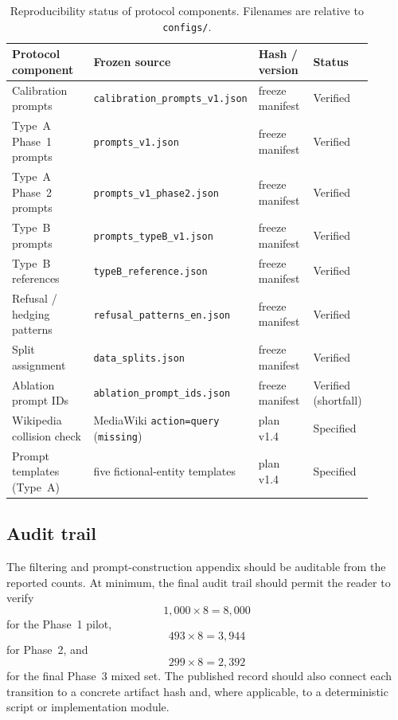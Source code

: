 \documentclass{article}
\begin{document}
\begin{table}[t]
\centering
\caption{Reproducibility status of protocol components. Filenames are relative to \texttt{configs/}.}
\label{tab:repro-status}
\small
\setlength{\tabcolsep}{3pt}
\begin{tabular}{@{}p{0.26\linewidth}p{0.34\linewidth}p{0.16\linewidth}p{0.14\linewidth}@{}}
\toprule
Protocol component & Frozen source & Hash / version & Status \\
\midrule
Calibration prompts & \texttt{calibration\_prompts\_v1.json} & freeze manifest & Verified \\
Type~A Phase~1 prompts & \texttt{prompts\_v1.json} & freeze manifest & Verified \\
Type~A Phase~2 prompts & \texttt{prompts\_v1\_phase2.json} & freeze manifest & Verified \\
Type~B prompts & \texttt{prompts\_typeB\_v1.json} & freeze manifest & Verified \\
Type~B references & \texttt{typeB\_reference.json} & freeze manifest & Verified \\
Refusal / hedging patterns & \texttt{refusal\_patterns\_en.json} & freeze manifest & Verified \\
Split assignment & \texttt{data\_splits.json} & freeze manifest & Verified \\
Ablation prompt {IDs} & \texttt{ablation\_prompt\_ids.json} & freeze manifest & Verified (shortfall) \\
Wikipedia collision check & MediaWiki \texttt{action=query} (\texttt{missing}) & plan v1.4 & Specified \\
Prompt templates (Type~A) & five fictional-entity templates & plan v1.4 & Specified \\
\bottomrule
\end{tabular}
\end{table}

\subsection{Audit trail}
\label{app:b-audit}

The filtering and prompt-construction appendix should be auditable from the reported counts.
At minimum, the final audit trail should permit the reader to verify
\begin{equation}
  1{,}000\times 8=8{,}000
\end{equation}
for the Phase~1 pilot,
\begin{equation}
  493\times 8=3{,}944
\end{equation}
for Phase~2, and
\begin{equation}
  299\times 8=2{,}392
\end{equation}
for the final Phase~3 mixed set.
The published record should also connect each transition to a concrete artifact hash and, where applicable, to a deterministic script or implementation module.
\end{document}
